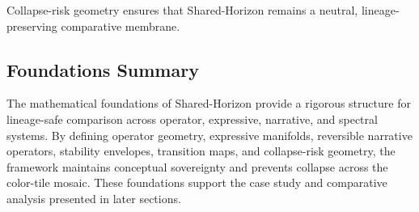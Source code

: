 Collapse-risk geometry ensures that Shared-Horizon remains a neutral,
lineage-preserving comparative membrane.

\subsection{Foundations Summary}

The mathematical foundations of Shared-Horizon provide a rigorous structure for
lineage-safe comparison across operator, expressive, narrative, and spectral
systems. By defining operator geometry, expressive manifolds, reversible
narrative operators, stability envelopes, transition maps, and collapse-risk
geometry, the framework maintains conceptual sovereignty and prevents collapse
across the color-tile mosaic. These foundations support the case study and
comparative analysis presented in later sections.
